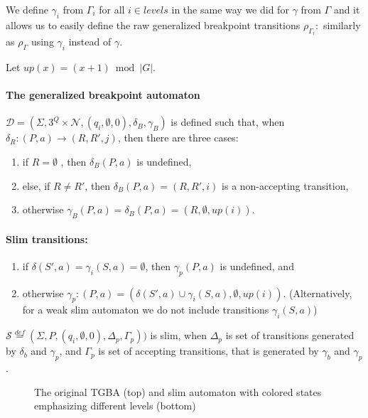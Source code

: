 \documentclass[
	digital,
nolof, nolot
]{fithesis3}
\newcommand{\cD}{\mathcal{D}}
\newcommand{\cN}{\mathcal{N}}
\newcommand{\cS}{\mathcal{S}}
\newcommand{\eqdef}{\overset{def}{=}}
\begin{document}
			We define $\gamma_i$ from $\Gamma_i$ for all $i \in levels$ in the same way we did for $\gamma$ from $\Gamma$ and it allows us to easily define the raw generalized breakpoint transitions
			$\rho_{\Gamma_{i}}\colon$ similarly as $\rho_\Gamma$ using $\gamma_i$ instead of $\gamma$.
			
			Let $up(x)=(x+1)\bmod|G|$.
			
			\paragraph{The generalized breakpoint automaton} $\cD=(\Sigma, 3^Q\times\cN, ({q_i},\emptyset, 0),\delta_B,\gamma_B)$ is defined such that, when $\delta_R\colon(P, a) \rightarrow (R, R', j)$, then there are three cases:
			
			
			
			\begin{enumerate}
				\item if $R=\emptyset$ , then $\delta_B(P,a)$ is undefined,
				\item else, if $R \neq R'$, then $\delta_B(P,a) = (R,R',i)$ is a non-accepting transition,
				\item otherwise $\gamma_B(P, a) = \delta_B(P,a) = (R, \emptyset, up(i))$.
			\end{enumerate}
		
		
			\paragraph{Slim transitions:}
			\begin{enumerate}
				\item if $\delta(S',a)=\gamma_{i}(S, a)=\emptyset$, then $ \gamma_{p}(P,a)$ is undefined, and
				\item otherwise $\gamma_p \colon (P,a) = (\delta(S',a)\cup \gamma_{i}(S, a), \emptyset, up(i))$. (Alternatively, for a weak slim automaton we do not include transitions $\gamma_{i}(S, a)$)
			\end{enumerate}
			$\cS\eqdef(\Sigma, P, (q_i,\emptyset,0), \Delta_p,\Gamma_p))$ is slim, when $\Delta_p$ is set of transitions generated by $\delta_b$ and $\gamma_p$, and $\Gamma_p$ is set of accepting transitions, that is generated by $\gamma_b$ and $\gamma_p$.
			
						
			\begin{figure}[ht]
				\begin{center}
					
					
				\end{center}
				\caption{The original TGBA (top) and slim automaton with colored states emphasizing different levels (bottom)  }
				\label{fig:slim:gg}
			\end{figure}
			
\end{document}

